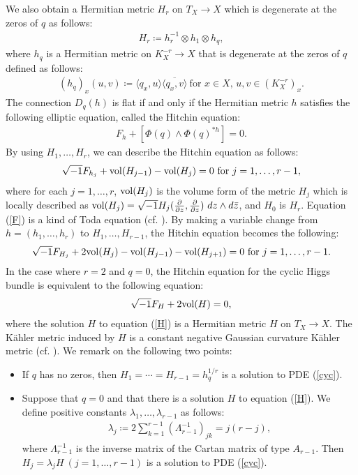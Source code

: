 \documentclass[12pt]{article}
\theoremstyle{definition}
\def\vol{{\rm vol}}
\def\inum{{\sqrt{-1}}}
\begin{document}
We also obtain a Hermitian metric $H_r$ on $T_X\rightarrow X$ which is degenerate at the zeros of $q$ as follows:
\begin{align*}
H_r\coloneqq h_r^{-1}\otimes h_1 \otimes h_q,
\end{align*}
where $h_q$ is a Hermitian metric on $K_X^{-r}\rightarrow X$ that is degenerate at the zeros of $q$ defined as follows:
\begin{align}
(h_q)_x(u,v)\coloneqq \langle q_x,u\rangle\overline{\langle q_x,v\rangle} \ \text{for $x\in X$, $u,v\in (K_X^{-r})_x$}. \label{q}
\end{align}
The connection $D_q(h)$ is flat if and only if the Hermitian metric $h$ satisfies the following elliptic equation, called the Hitchin equation:
\begin{align*}
F_h + [\Phi(q)\wedge\Phi(q)^{\ast h}] = 0.
\end{align*}
By using $H_1,\dots, H_r$, we can describe the Hitchin equation as follows: 
\begin{align}
\inum F_{h_j} + \vol(H_{j-1}) - \vol(H_j) = 0 \ \text{for $j=1,\dots, r-1$}, \label{F}
\end{align}
where for each $j=1,\dots, r$, $\vol(H_j)$ is the volume form of the metric $H_j$ which is locally described as $\vol(H_j)=\inum H_j(\frac{\partial}{\partial z}, \frac{\partial}{\partial z})\ dz\wedge d\bar{z}$, and $H_0$ is $H_r$. Equation (\ref{F}) is a kind of Toda equation (cf. \cite{AF1, Bar1, GH1, GL1, Moc0, Moc1}). By making a variable change from $h=(h_1,\dots, h_r)$ to $H_1,\dots, H_{r-1}$, the Hitchin equation becomes the following:
\begin{align}
\inum F_{H_j} + 2\vol(H_j) - \vol(H_{j-1}) - \vol(H_{j+1}) = 0 \ \text{for $j=1,\dots, r-1$.} \label{cyc}
\end{align}
In the case where $r=2$ and $q=0$, the Hitchin equation for the cyclic Higgs bundle is equivalent to the following equation:
\begin{align}
\inum F_H + 2\vol(H) = 0, \label{H}
\end{align}
where the solution $H$ to equation (\ref{H}) is a Hermitian metric $H$ on $T_X\rightarrow X$. The K\"ahler metric induced by $H$ is a constant negative Gaussian curvature K\"ahler metric (cf. \cite{Hit1}). 
We remark on the following two points:
\begin{itemize}
\item If $q$ has no zeros, then $H_1=\cdots=H_{r-1}=h_q^{1/r}$ is a solution to PDE (\ref{cyc}).
\item Suppose that $q=0$ and that there is a solution $H$ to equation (\ref{H}). We define positive constants $\lambda_1,\dots, \lambda_{r-1}$ as follows: 
\begin{align}
\lambda_j\coloneqq 2\sum_{k=1}^{r-1}(\Lambda_{r-1}^{-1})_{jk} = j(r-j), \label{lambda}
\end{align}
where $\Lambda_{r-1}^{-1}$ is the inverse matrix of the Cartan matrix of type $A_{r-1}$. Then $H_j=\lambda_j H\ (j=1,\dots, r-1)$ is a solution to PDE (\ref{cyc}).
\end{itemize}
\end{document}
